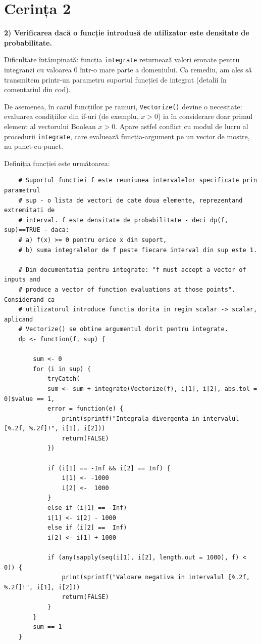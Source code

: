 \documentclass[12pt]{article}
\begin{document}
	\section{Cerința 2}
\textbf{2) Verificarea dacă o funcție introdusă de utilizator este densitate de probabilitate.}\vspace{5mm}

Dificultate întâmpinată: funcția \lstinline|integrate| returnează valori eronate pentru integranzi cu valoarea $0$ într-o mare parte a domeniului. Ca remediu, am ales să transmitem printr-un parametru suportul funcției de integrat (detalii în comentariul din cod).\par
De asemenea, în cazul funcțiilor pe ramuri, \lstinline|Vectorize()| devine o necesitate: evaluarea condițiilor din if-uri (de exemplu, $x > 0$) ia în considerare doar primul element al vectorului Boolean $x > 0$. Apare astfel conflict cu modul de lucru al procedurii \lstinline|integrate|, care evaluează funcția-argument pe un vector de mostre, nu punct-cu-punct.\par
Definiția funcției este următoarea: \\

\begin{lstlisting}
	# Suportul functiei f este reuniunea intervalelor specificate prin parametrul
	# sup - o lista de vectori de cate doua elemente, reprezentand extremitati de
	# interval. f este densitate de probabilitate - deci dp(f, sup)==TRUE - daca:
	# a) f(x) >= 0 pentru orice x din suport,
	# b) suma integralelor de f peste fiecare interval din sup este 1.
	
	# Din documentatia pentru integrate: "f must accept a vector of inputs and
	# produce a vector of function evaluations at those points". Considerand ca
	# utilizatorul introduce functia dorita in regim scalar -> scalar, aplicand
	# Vectorize() se obtine argumentul dorit pentru integrate.
	dp <- function(f, sup) {
		
		sum <- 0
		for (i in sup) {
			tryCatch(
			sum <- sum + integrate(Vectorize(f), i[1], i[2], abs.tol = 0)$value == 1,
			error = function(e) {
				print(sprintf("Integrala divergenta in intervalul [%.2f, %.2f]!", i[1], i[2]))
				return(FALSE)
			})
			
			if (i[1] == -Inf && i[2] == Inf) {
				i[1] <- -1000
				i[2] <-  1000
			}
			else if (i[1] == -Inf)
			i[1] <- i[2] - 1000
			else if (i[2] ==  Inf)
			i[2] <- i[1] + 1000
			
			if (any(sapply(seq(i[1], i[2], length.out = 1000), f) < 0)) {
				print(sprintf("Valoare negativa in intervalul [%.2f, %.2f]!", i[1], i[2]))
				return(FALSE)
			}
		}
		sum == 1
	}
\end{lstlisting}\vspace*{3\baselineskip} 
\end{document}
